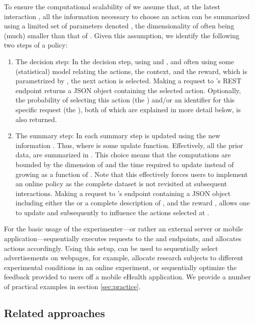 \documentclass[nojss]{jss}
\begin{document}
To ensure the computational scalability of  we assume that, at the latest interaction , all the information necessary to choose an action can be summarized using a limited set of parameters denoted , the dimensionality of  often being (much) smaller than that of . Given this assumption, we identify the following two steps of a policy:
\begin{enumerate}
\item The decision step: In the decision step, using  and , and often using some (statistical) model relating the actions, the context, and the reward, which is parametrized by , the next action  is selected. Making a request to 's  REST endpoint returns a JSON object containing the selected action. Optionally, the probability  of selecting this action (the ) and/or an identifier for this specific request (the ), both of which are explained in more detail below, is also returned.
\item The summary step: In each summary step  is updated using the new information . Thus,  where  is some update function. Effectively, all the prior data,  are summarized in . This choice means that the computations are bounded by the dimension of  and the time required to update  instead of growing as a function of . Note that this effectively forces users to implement an online policy \citep{Michalak2012} as the complete dataset  is not revisited at subsequent interactions. Making a request to 's  endpoint containing a JSON object including either the  or a complete description of , and the reward , allows one to update  and subsequently to influence the actions selected at .
\end{enumerate} 

For the basic usage of  the experimenter---or rather an external server or mobile application---sequentially executes requests to the  and  endpoints, and allocates actions accordingly. Using this setup,  can be used to sequentially select advertisements on webpages, for example, allocate research subjects to different experimental conditions in an online experiment, or sequentially optimize the feedback provided to users off a mobile eHealth application. We provide a number of practical examples in section \ref{sec:practice}.

\subsection{Related approaches}
\end{document}
